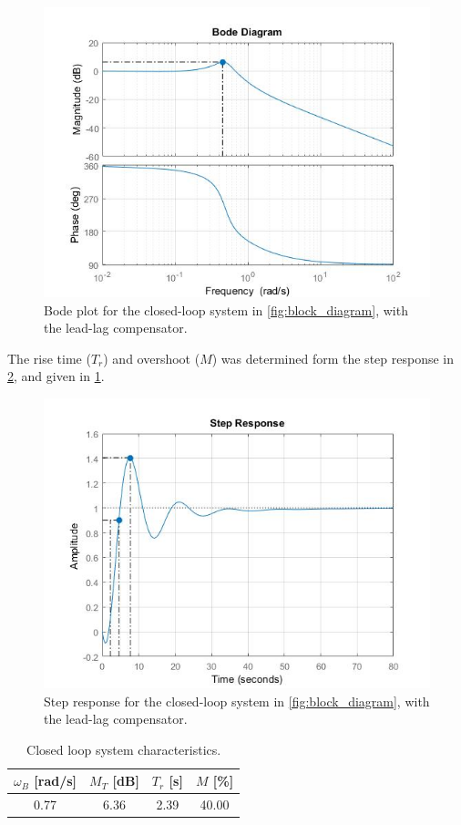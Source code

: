 \documentclass[a4paper]{article}
\begin{document}
\begin{figure}[!ht]
\centering
\includegraphics[width=.8\linewidth]{bode_closedloop}
\caption{Bode plot for the closed-loop system in \cref{fig:block_diagram}, with the lead-lag compensator.}
\label{fig:bode_closedloop}
\end{figure}

The rise time ($T_r$) and overshoot ($M$) was determined form the step response in \cref{fig:step_response}, and given in \cref{tb:response}.

\begin{figure}[!ht]
	\begin{center}
		\includegraphics[width=.75\linewidth]{step_response}
	\end{center}
	\caption{Step response for the closed-loop system in \cref{fig:block_diagram}, with the lead-lag compensator.}
	\label{fig:step_response}
\end{figure}

\begin{table}[!h]
\begin{center}
	\begin{tabular}{|c|c|c|c|}
		\hline
		$\omega_B$ [rad/s] & $M_T$ [dB] & $T_r$ [s] & $M$ [\%] \\
		\hline
		0.77 & 6.36 & 2.39 & 40.00 \\
		\hline
	\end{tabular}
\end{center}
\caption{Closed loop system characteristics.}
\label{tb:response}
\end{table}
\end{document}
